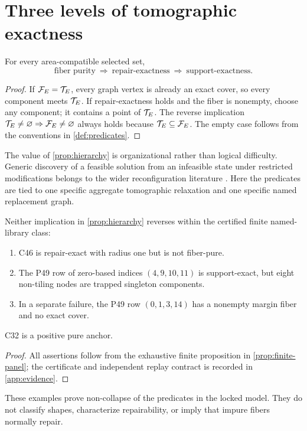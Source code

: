 \section{Three levels of tomographic exactness}\label{sec:exactness}

\begin{proposition}\label{prop:hierarchy}
For every area-compatible selected set,
\[
  \text{fiber purity}\ \Longrightarrow\
  \text{repair-exactness}\ \Longrightarrow\
  \text{support-exactness}.
\]
\end{proposition}

\begin{proof}
If \(\mathcal F_E=\mathcal T_E\), every graph vertex is already an exact cover, so every
component meets \(\mathcal T_E\).  If repair-exactness holds and the fiber is
nonempty, choose any component; it contains a point of \(\mathcal T_E\).  The reverse
implication \(\mathcal T_E\neq\varnothing\Rightarrow\mathcal F_E\neq\varnothing\)
always holds because \(\mathcal T_E\subseteq\mathcal F_E\).  The empty case follows from
the conventions in \cref{def:predicates}.
\end{proof}

The value of \cref{prop:hierarchy} is organizational rather than logical
difficulty.  Generic discovery of a feasible solution from an infeasible
state under restricted modifications belongs to the wider reconfiguration
literature \cite{FellowsEtAl2023}.  Here the predicates are tied to one
specific aggregate tomographic relaxation and one specific named
replacement graph.

\begin{proposition}
\label{prop:strictness}
Neither implication in \cref{prop:hierarchy} reverses within the certified
finite named-library class:
\begin{enumerate}
  \item C46 is repair-exact with radius one but is not fiber-pure.
  \item The P49 row of zero-based indices \((4,9,10,11)\) is support-exact,
        but eight non-tiling nodes are trapped singleton components.
  \item In a separate failure, the P49 row \((0,1,3,14)\) has a nonempty
        margin fiber and no exact cover.
\end{enumerate}
C32 is a positive pure anchor.
\end{proposition}

\begin{proof}
All assertions follow from the exhaustive finite proposition in
\cref{prop:finite-panel}; the certificate and independent replay contract is
recorded in \cref{app:evidence}.
\end{proof}

These examples prove non-collapse of the predicates in the locked model.
They do not classify shapes, characterize repairability, or imply that
impure fibers normally repair.
